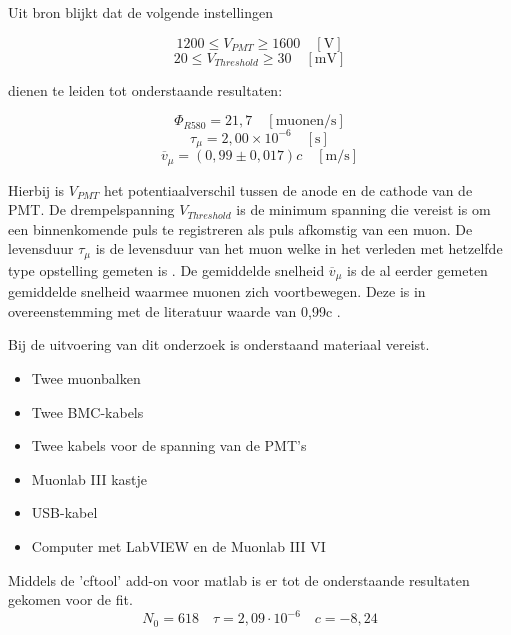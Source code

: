 Uit bron \cite{masterthesis} blijkt dat de volgende instellingen

\begin{equation}
		1200 \leq V_{PMT} \geq 1600 \quad \mathrm{[V]}
\end{equation}
\begin{equation}
	20 \leq V_{Threshold} \geq 30 \quad \mathrm{[mV]}
\end{equation}

dienen te leiden tot onderstaande resultaten:

\begin{equation}
	\Phi_{R580} = 21,7 \quad \mathrm{[muonen/s]}
\end{equation}
\begin{equation}
	\tau_{\mu} =   2,00 \times 10^{-6}\quad \mathrm{[s]}
\end{equation}
\begin{equation}
	\overline{v}_{\mu} = (0,99 \pm 0,017) c \quad \mathrm{[m/s]}
\end{equation}

Hierbij is $V_{PMT}$ het potentiaalverschil tussen de anode en de cathode van de PMT. De drempelspanning $V_{Threshold}$ is de minimum spanning die vereist is om een binnenkomende puls te registreren als puls afkomstig van een muon. De levensduur $\tau_{\mu}$ is de levensduur van het muon welke in het verleden met hetzelfde type opstelling gemeten is \cite{masterthesis}. De gemiddelde snelheid $\overline{v}_{\mu}$ is de al eerder gemeten gemiddelde snelheid waarmee muonen zich voortbewegen. Deze is in overeenstemming met de literatuur waarde van 0,99c \cite{masterthesis}.

Bij de uitvoering van dit onderzoek is onderstaand materiaal vereist.

\begin{itemize}
	\item Twee muonbalken
	\item Twee BMC-kabels
	\item Twee kabels voor de spanning van de PMT's
	\item Muonlab III kastje
	\item USB-kabel
	\item Computer met LabVIEW en de Muonlab III VI
\end{itemize}

Middels de 'cftool' add-on voor matlab is er tot de onderstaande resultaten gekomen voor de fit.
\begin{equation}
N_0 = 618 \quad \tau = 2,09\cdot10^{-6} \quad c = -8,24 \label{eq:lifetime_fit}
\end{equation}

